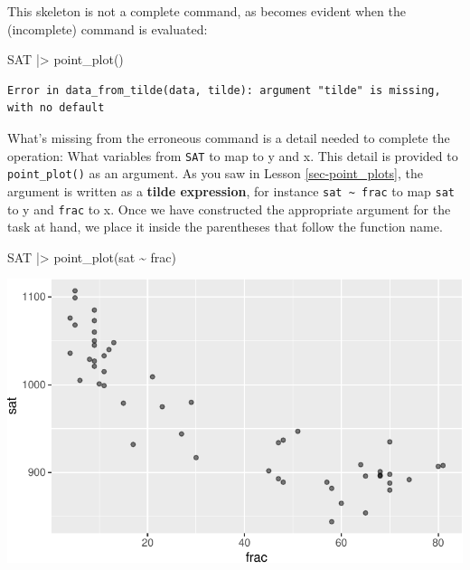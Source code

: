 \documentclass[
  letterpaper,
  DIV=11,
  numbers=noendperiod,
  oneside]{scrartcl}
\newenvironment{Shaded}{\begin{snugshade}}{\end{snugshade}}
\newcommand{\FunctionTok}[1]{\textcolor[rgb]{0.28,0.35,0.67}{#1}}
\newcommand{\NormalTok}[1]{\textcolor[rgb]{0.00,0.23,0.31}{#1}}
\newcommand{\SpecialCharTok}[1]{\textcolor[rgb]{0.37,0.37,0.37}{#1}}
\begin{document}
This skeleton is not a complete command, as becomes evident when the
(incomplete) command is evaluated:

\begin{Shaded}
\begin{Highlighting}[]
\NormalTok{SAT }\SpecialCharTok{|\textgreater{}} \FunctionTok{point\_plot}\NormalTok{()}
\end{Highlighting}
\end{Shaded}

\begin{verbatim}
Error in data_from_tilde(data, tilde): argument "tilde" is missing, with no default
\end{verbatim}

What's missing from the erroneous command is a detail needed to complete
the operation: What variables from \texttt{SAT} to map to y and x. This
detail is provided to \texttt{point\_plot()} as an argument. As you saw
in Lesson \ref{sec-point_plots}, the argument is written as a
\textbf{tilde expression}, for instance
\texttt{sat\ \textasciitilde{}\ frac} to map \texttt{sat} to y and
\texttt{frac} to x. Once we have constructed the appropriate argument
for the task at hand, we place it inside the parentheses that follow the
function name.

\begin{Shaded}
\begin{Highlighting}[]
\NormalTok{SAT }\SpecialCharTok{|\textgreater{}} \FunctionTok{point\_plot}\NormalTok{(sat }\SpecialCharTok{\textasciitilde{}}\NormalTok{ frac) }
\end{Highlighting}
\end{Shaded}

\includegraphics{test-tufte_files/figure-pdf/unnamed-chunk-84-1.pdf}
\end{document}
